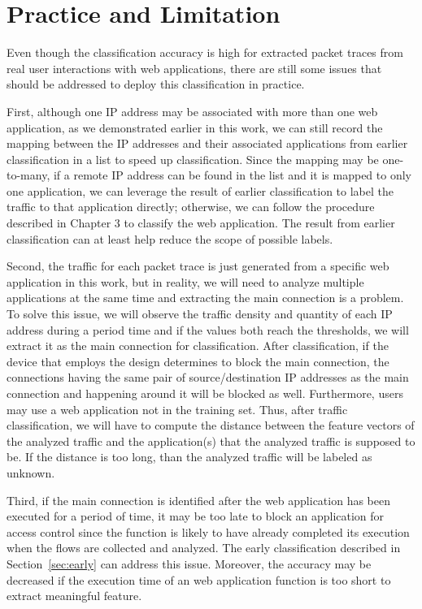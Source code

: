 \section{Practice and Limitation}
\label{sec:app_limit}

Even though the classification accuracy is high for extracted packet traces from real user interactions with web applications, there are still some issues that should be addressed to deploy this classification in practice.

First, although one IP address may be associated with more than one web application, as we demonstrated earlier in this work, we can still record the mapping between the IP addresses and their associated applications from earlier classification in a list to speed up classification. Since the mapping may be one-to-many, if a remote IP address can be found in the list and it is mapped to only one application, we can leverage the result of earlier classification to label the traffic to that application directly; otherwise, we can follow the procedure described in Chapter 3 to classify the web application. The result from earlier classification can at least help reduce the scope of possible labels.

Second, the traffic for each packet trace is just generated from a specific web application in this work, but in reality, we will need to analyze multiple applications at the same time and extracting the main connection is a problem. To solve this issue, we will observe the traffic density and quantity of each IP address during a period time and if the values both reach the thresholds, we will extract it as the main connection for classification. After classification, if the device that employs the design determines to block the main connection, the connections having the same pair of source/destination IP addresses as the main connection and happening around it will be blocked as well. Furthermore, users may use a web application not in the training set. Thus, after traffic classification, we will have to compute the distance between the feature vectors of the analyzed traffic and the application(s) that the analyzed traffic is supposed to be. If the distance is too long, than the analyzed traffic will be labeled as unknown.


Third, if the main connection is identified after the web application has been executed for a period of time, it may be too late to block an application for access control since the function is likely to have already completed its execution when the flows are collected and analyzed. The early classification described in Section~\ref{sec:early} can address this issue. Moreover, the accuracy may be decreased if the execution time of an web application function is too short to extract meaningful feature. 
